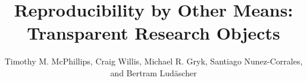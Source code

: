 \documentclass[sigconf,screen,nonacm]{acmart}
\begin{document}
\title[Reproducibility by Other Means]{Reproducibility by Other Means: Transparent Research Objects}

\author{Timothy M. McPhillips, Craig Willis, Michael R. Gryk, Santiago Nunez-Corrales, and Bertram Lud\"ascher}
 



\maketitle
















%
%


\end{document}
